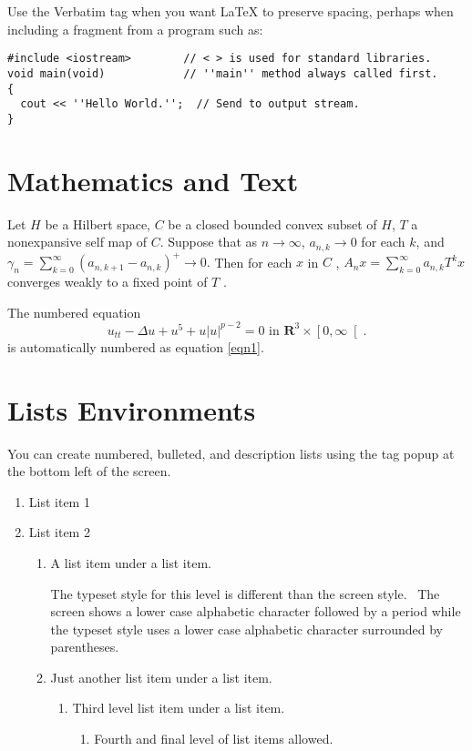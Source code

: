 \documentclass[11pt,spanish]{report}
\begin{document}
Use the Verbatim tag when you want \LaTeX{} to preserve spacing, perhaps
when including a fragment from a program such as:
\begin{verbatim}
#include <iostream>        // < > is used for standard libraries.
void main(void)            // ''main'' method always called first.
{
  cout << ''Hello World.'';  // Send to output stream.
}
\end{verbatim}

\section{Mathematics and Text}

Let $H$ be a Hilbert space, $C$ be a closed bounded convex subset of $H$, $T$
a nonexpansive self map of $C$. Suppose that as $n\rightarrow \infty $, $%
a_{n,k}\rightarrow 0$ for each $k$, and $\gamma _{n}=\sum_{k=0}^{\infty
}\left( a_{n,k+1}-a_{n,k}\right) ^{+}\rightarrow 0.$ Then for each $x$ in $C$%
, $A_{n}x=\sum_{k=0}^{\infty }a_{n,k}T^{k}x$ converges weakly to a fixed
point of $T$ .

The numbered equation 
\begin{equation}
u_{tt}-\Delta u+u^{5}+u\left| u\right| ^{p-2}=0\text{ in }\mathbf{R}%
^{3}\times \left[ 0,\infty \right[ .  \label{eqn1}
\end{equation}%
is automatically numbered as equation \ref{eqn1}.

\section{Lists Environments}

You can create numbered, bulleted, and description lists using the tag popup
at the bottom left of the screen.

\begin{enumerate}
\item List item 1

\item List item 2

\begin{enumerate}
\item A list item under a list item.

The typeset style for this level is different than the screen style. \ The
screen shows a lower case alphabetic character followed by a period while
the typeset style uses a lower case alphabetic character surrounded by
parentheses.

\item Just another list item under a list item.

\begin{enumerate}
\item Third level list item under a list item.

\begin{enumerate}
\item Fourth and final level of list items allowed.
\end{enumerate}
\end{enumerate}
\end{enumerate}
\end{enumerate}
\end{document}

